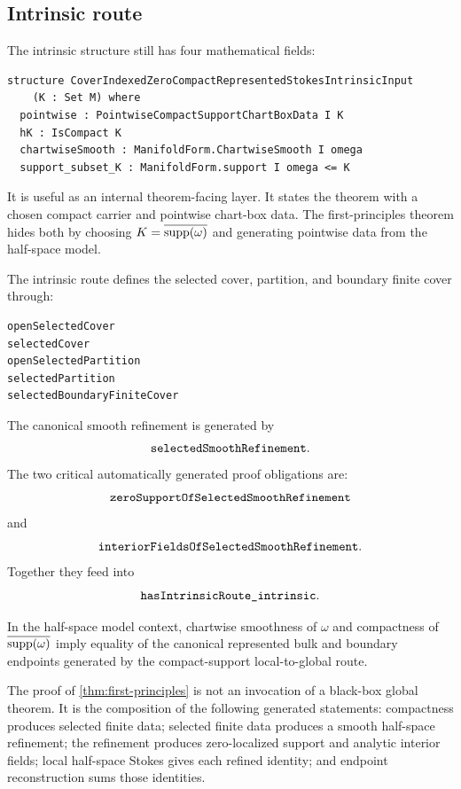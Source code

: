 \subsection{Intrinsic route}

The intrinsic structure still has four mathematical fields:
\begin{lstlisting}[language=Lean]
structure CoverIndexedZeroCompactRepresentedStokesIntrinsicInput
    (K : Set M) where
  pointwise : PointwiseCompactSupportChartBoxData I K
  hK : IsCompact K
  chartwiseSmooth : ManifoldForm.ChartwiseSmooth I omega
  support_subset_K : ManifoldForm.support I omega <= K
\end{lstlisting}
It is useful as an internal theorem-facing layer.  It states the theorem with a
chosen compact carrier and pointwise chart-box data.  The first-principles
theorem hides both by choosing \(K=\overline{\operatorname{supp}(\omega)}\) and generating
pointwise data from the half-space model.

The intrinsic route defines the selected cover, partition, and boundary finite
cover through:
\begin{lstlisting}[language=Lean]
openSelectedCover
selectedCover
openSelectedPartition
selectedPartition
selectedBoundaryFiniteCover
\end{lstlisting}
The canonical smooth refinement is generated by
\[
\code{selectedSmoothRefinement}.
\]
The two critical automatically generated proof obligations are:
\[
\code{zeroSupportOfSelectedSmoothRefinement}
\]
and
\[
\code{interiorFieldsOfSelectedSmoothRefinement}.
\]
Together they feed into
\[
\code{hasIntrinsicRoute_intrinsic}.
\]

\begin{theorem}
\label{thm:first-principles}
In the half-space model context, chartwise smoothness of \(\omega\) and
compactness of \(\overline{\operatorname{supp}(\omega)}\) imply equality of the canonical
represented bulk and boundary endpoints generated by the compact-support
local-to-global route.
\end{theorem}

The proof of \cref{thm:first-principles} is not an invocation of a black-box
global theorem.  It is the composition of the following generated statements:
compactness produces selected finite data; selected finite data produces a
smooth half-space refinement; the refinement produces zero-localized support
and analytic interior fields; local half-space Stokes gives each refined
identity; and endpoint reconstruction sums those identities.

